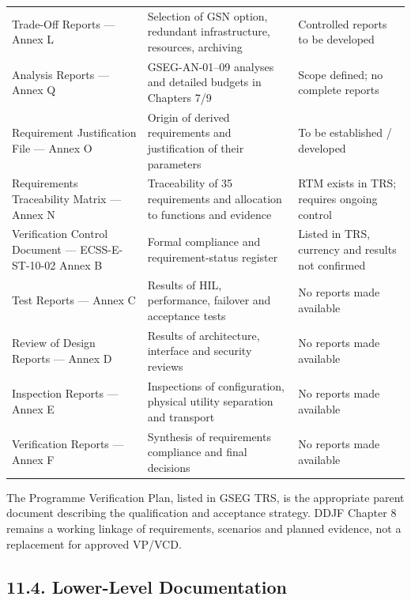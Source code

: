 \begingroup{}
\begin{longtable}{|P{0.32}|P{0.37}|P{0.31}|}
\hline{}
 &  & \\ \hline
\endhead
\hline\endlastfoot
Trade-Off Reports — Annex L & Selection of GSN option, redundant infrastructure, resources, archiving & Controlled reports to be developed\\ \hline
Analysis Reports — Annex Q & GSEG-AN-01–09 analyses and detailed budgets in Chapters 7/\allowbreak{}9 & Scope defined; no complete reports\\ \hline
Requirement Justification File — Annex O & Origin of derived requirements and justification of their parameters & To be established /\allowbreak{} developed\\ \hline
Requirements Traceability Matrix — Annex N & Traceability of 35 requirements and allocation to functions and evidence & RTM exists in TRS; requires ongoing control\\ \hline
Verification Control Document — ECSS-E-ST-10-02 Annex B & Formal compliance and requirement-status register & Listed in TRS, currency and results not confirmed\\ \hline
Test Reports — Annex C & Results of HIL, performance, failover and acceptance tests & No reports made available\\ \hline
Review of Design Reports — Annex D & Results of architecture, interface and security reviews & No reports made available\\ \hline
Inspection Reports — Annex E & Inspections of configuration, physical utility separation and transport & No reports made available\\ \hline
Verification Reports — Annex F & Synthesis of requirements compliance and final decisions & No reports made available\\*
\end{longtable}
\endgroup

The Programme Verification Plan, listed in GSEG TRS, is the appropriate parent document describing the qualification and acceptance strategy. DDJF Chapter 8 remains a working linkage of requirements, scenarios and planned evidence, not a replacement for approved VP/\allowbreak{}VCD.

\subsection{11.4. Lower-Level Documentation}\label{ddjf-11-4}

